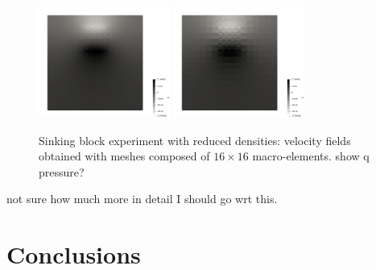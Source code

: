 \documentclass[a4paper,12pt]{article}
\begin{document}
\begin{figure}[t]
\includegraphics[width=4.3cm]{../results/exp08/fig16x16_reduced/press.0006.png}
\includegraphics[width=4.3cm]{../results/exp08/fig16x16_reduced/press.0007.png}
\caption{Sinking block experiment with reduced densities: velocity fields 
obtained with meshes composed of $16\times 16$ macro-elements.
{\color{red} show q pressure?}
 \label{fig:block4}}
\end{figure}


{\color{red} not sure how much more in detail I should go wrt this.}





\newpage
\section{Conclusions}\label{sec5}
\end{document}

